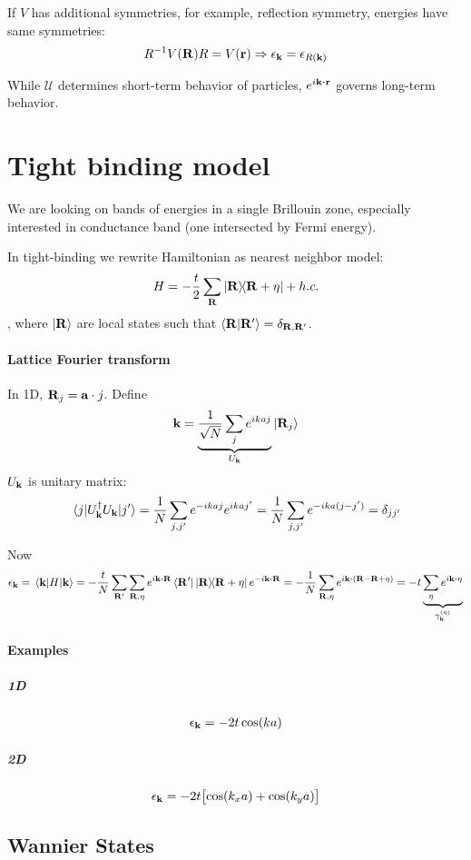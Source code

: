 If $V$ has additional symmetries, for example, reflection symmetry, energies have same symmetries:
\begin{align}
R^{-1} V(\vb{R}) R = V(\vb{r}) \Rightarrow \epsilon_{\vb{k}} =  \epsilon_{R(\vb{k})}
\end{align}

While $\mathcal{U}$ determines short-term behavior of particles, $e^{i \vb{k} \vdot \vb{r}}$ governs long-term behavior.

\section{Tight binding model}
We are looking on bands of energies in a single Brillouin zone, especially interested in conductance band (one intersected by Fermi energy).

In tight-binding we rewrite Hamiltonian as nearest neighbor model:
 \begin{align}
 H = -\frac{t}{2} \sum_{\vb{R}} \dyad{\vb{R}}{\vb{R}+\vb{\eta}} + h.c.
 \end{align}
, where $\ket{\vb{R}}$ are local states such that $\braket{\vb{R}}{\vb{R}'} = \delta_{\vb{R},\vb{R}'}$.

\paragraph{Lattice Fourier transform}
In 1D, $\vb{R}_j = \vb{a}\cdot j$. Define 
\begin{align}
\vb{k} = \underbrace{\frac{1}{\sqrt{N}} \sum_j e^{ikaj}}_{U_{\vb{k}}} \ket{\vb{R}_j}
\end{align}
$U_{\vb{k}}$ is unitary matrix:
\begin{align}
\mel{j}{U^\dagger_{\vb{k}}U_{\vb{k}}}{j'} = \frac{1}{N} \sum_{j,j'} e^{-ikaj}e^{ikaj'} = \frac{1}{N} \sum_{j,j'} e^{-ika(j-j')} = \delta_{jj'}
\end{align}

Now
\begin{align}
\epsilon_{\vb{k}} =\mel{\vb{k}}{H}{\vb{k}} = -\frac{t}{N} \sum_{\vb{R}'} \sum_{\vb{R}, \vb{\eta}} e^{i \vb{k} \vdot \vb{R} } \bra{\vb{R}'}\dyad{\vb{R}}{\vb{R}+\vb{\eta}} e^{-i \vb{k} \vdot \vb{R}} = -\frac{1}{N} \sum_{\vb{R}, \vb{\eta}} e^{i\vb{k} \vdot \qty(\vb{R} - \vb{R} + \vb{\eta})} = -t \underbrace{\sum_{\vb{\eta}} e^{i \vb{k} \vdot \vb{\eta}} }_{\gamma_{\vb{k}}^{(\eta)}}
\end{align}

\paragraph{Examples}
\subparagraph{1D}
\begin{align}
\epsilon_{\vb{k}} = -2t \cos(ka)
\end{align}
\subparagraph{2D}
\begin{align}
\epsilon_{\vb{k}} = -2t \qty\big[\cos(k_x a)+\cos(k_y a)]
\end{align}

\subsection{Wannier States}